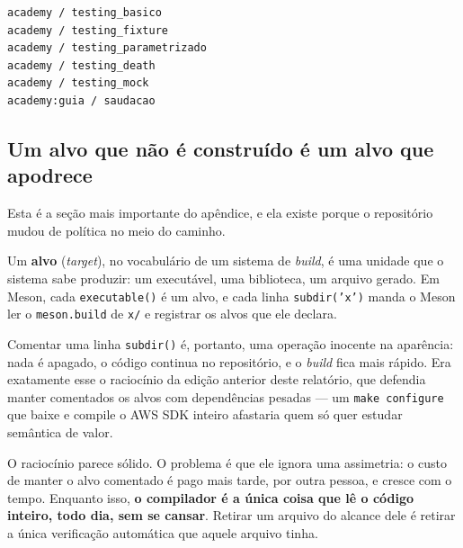 \begin{lstlisting}[style=bt, language=bash, caption={Os seis alvos registrados,
    obtidos com \texttt{meson test -C build --list}. Os cinco primeiros vêm de
    \texttt{src/testing/}; o sexto é o exemplo mínimo de
    \texttt{src/meson/}, que existe para ensinar a própria função
    \texttt{test()}.}]
academy / testing_basico
academy / testing_fixture
academy / testing_parametrizado
academy / testing_death
academy / testing_mock
academy:guia / saudacao
\end{lstlisting}

\subsection{Um alvo que não é construído é um alvo que apodrece}
\label{sec:apodrece}

Esta é a seção mais importante do apêndice, e ela existe porque o repositório
mudou de política no meio do caminho.

\begin{porque}
Um \textbf{alvo} (\emph{target}), no vocabulário de um sistema de \emph{build},
é uma unidade que o sistema sabe produzir: um executável, uma biblioteca, um
arquivo gerado. Em Meson, cada \texttt{executable()} é um alvo, e cada linha
\texttt{subdir('x')} manda o Meson ler o \texttt{meson.build} de \texttt{x/} e
registrar os alvos que ele declara.

Comentar uma linha \texttt{subdir()} é, portanto, uma operação inocente na
aparência: nada é apagado, o código continua no repositório, e o \emph{build}
fica mais rápido. Era exatamente esse o raciocínio da edição anterior deste
relatório, que defendia manter comentados os alvos com dependências pesadas ---
um \texttt{make configure} que baixe e compile o AWS SDK inteiro afastaria quem
só quer estudar semântica de valor.

O raciocínio parece sólido. O problema é que ele ignora uma assimetria: o custo
de manter o alvo comentado é pago mais tarde, por outra pessoa, e cresce com o
tempo. Enquanto isso, \textbf{o compilador é a única coisa que lê o código
inteiro, todo dia, sem se cansar}. Retirar um arquivo do alcance dele é retirar
a única verificação automática que aquele arquivo tinha.
\end{porque}

